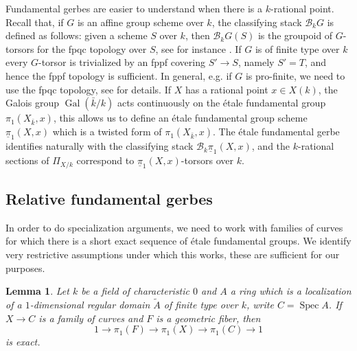 \documentclass[11pt]{amsart}
\theoremstyle{plain}
\newtheorem{lemma}[theorem]{Lemma}
\theoremstyle{definition}
\newcommand{\on}{\operatorname}
\newcommand{\1}{\mathbb{1}}
\newcommand{\gal}{\on{Gal}}
\newcommand{\mc}{\mathcal}
\newcommand{\spec}{\on{Spec}}
\newcommand{\upi}{\underline{\pi}}
\renewcommand{\tilde}{\widetilde}
\begin{document}
Fundamental gerbes are easier to understand when there is a $k$-rational point. Recall that, if $G$ is an affine group scheme over $k$, the classifying stack $\mc{B}_{k}G$ is defined as follows: given a scheme $S$ over $k$, then $\mc{B}_{k}G(S)$ is the groupoid of $G$-torsors for the fpqc topology over $S$, see for instance \cite[Definition 8.1.14]{olsson}. If $G$ is of finite type over $k$ every $G$-torsor is trivialized by an fppf covering $S'\to S$, namely $S'=T$, and hence the fppf topology is sufficient. In general, e.g. if $G$ is pro-finite, we need to use the fpqc topology, see \cite{bv15} for details. If $X$ has a rational point $x\in X(k)$, the Galois group $\gal(\bar{k}/k)$ acts continuously on the étale fundamental group $\pi_{1}(X_{\bar{k}},x)$, this allows us to define an étale fundamental group scheme $\upi_{1}(X,x)$ which is a twisted form of $\pi_{1}(X_{\bar{k}},x)$. The étale fundamental gerbe identifies naturally with the classifying stack $\mathcal{B}_{k}\upi_{1}(X,x)$, and the $k$-rational sections of $\Pi_{X/k}$ correspond to $\upi_{1}(X,x)$-torsors over $k$. 

\subsection{Relative fundamental gerbes}

In order to do specialization arguments, we need to work with families of curves for which there is a short exact sequence of étale fundamental groups. We identify very restrictive assumptions under which this works, these are sufficient for our purposes.


\begin{lemma}\label{families}
	Let $k$ be a field of characteristic $0$ and $A$ a ring which is a localization of a $1$-dimensional regular domain $\tilde{A}$ of finite type over $k$, write $C=\spec A$. If $X\to C$ is a family of curves and $F$ is a geometric fiber, then
	\[1\to\pi_{1}(F)\to\pi_{1}(X)\to\pi_{1}(C)\to 1\]
	is exact.  
\end{lemma}
\end{document}
